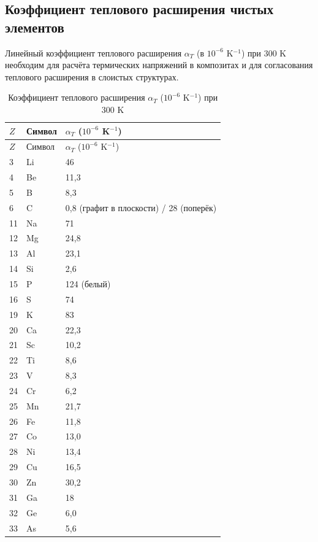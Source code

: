 \documentclass[12pt,a4paper]{article}
\begin{document}
	\subsection{Коэффициент теплового расширения чистых элементов}
	\label{subsec:thermal-expansion}
	
	Линейный коэффициент теплового расширения \(\alpha_T\) (в \(10^{-6}\) K\(^{-1}\)) при 300 K необходим для расчёта термических напряжений в композитах и для согласования теплового расширения в слоистых структурах.
	
	\begin{longtable}{p{0.6cm}p{1.2cm}p{1.5cm}}
		\caption{Коэффициент теплового расширения \(\alpha_T\) (\(10^{-6}\) K\(^{-1}\)) при 300 K} \label{tab:thermal-expansion-all} \\
		\toprule
		\(Z\) & Символ & \(\alpha_T\) (\(10^{-6}\) K\(^{-1}\)) \\
		\midrule
		\endfirsthead
		\toprule
		\(Z\) & Символ & \(\alpha_T\) (\(10^{-6}\) K\(^{-1}\)) \\
		\midrule
		\endhead
		3  & Li & 46 \\
		4  & Be & 11,3 \\
		5  & B  & 8,3 \\
		6  & C  & 0,8 (графит в плоскости) / 28 (поперёк) \\
		11 & Na & 71 \\
		12 & Mg & 24,8 \\
		13 & Al & 23,1 \\
		14 & Si & 2,6 \\
		15 & P  & 124 (белый) \\
		16 & S  & 74 \\
		19 & K  & 83 \\
		20 & Ca & 22,3 \\
		21 & Sc & 10,2 \\
		22 & Ti & 8,6 \\
		23 & V  & 8,3 \\
		24 & Cr & 6,2 \\
		25 & Mn & 21,7 \\
		26 & Fe & 11,8 \\
		27 & Co & 13,0 \\
		28 & Ni & 13,4 \\
		29 & Cu & 16,5 \\
		30 & Zn & 30,2 \\
		31 & Ga & 18 \\
		32 & Ge & 6,0 \\
		33 & As & 5,6 \\

\end{longtable}
\end{document}
